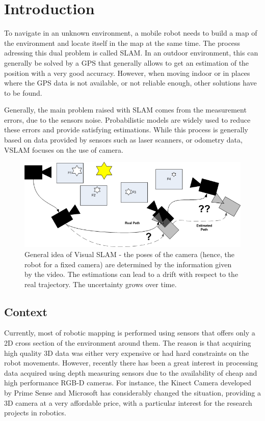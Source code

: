 \chapter{Introduction}

To navigate in an unknown environment, a mobile robot needs to build a map of the environment and locate itself in the map at the same time. The process adressing this dual problem is called \gls{SLAM}. In an outdoor environment, this can generally be solved by a GPS that generally allows to get an estimation of the position with a very good accuracy. However, when moving indoor or in places where the GPS data is not available, or not reliable enough, other solutions have to be found. 

Generally, the main problem raised with \gls{SLAM} comes from the measurement errors, due to the sensors noise. Probabilistic models are widely used to reduce these errors and provide satisfying estimations. While this process is generally based on data provided by sensors such as laser scanners, or odometry data, \gls{VSLAM} focuses on the use of camera. 

\begin{figure}[h!]
\begin{center}
\includegraphics[width=1.0\textwidth]{figures/visual_slam}
\caption{General idea of Visual SLAM - the poses of the camera (hence, the robot for a fixed camera) are determined by the information given by the video. The estimations can lead to a drift with respect to the real trajectory. The uncertainty grows over time.}
\end{center}
\end{figure}

\section{Context}

Currently, most of robotic mapping is performed using sensors that offers only a 2D cross section of the environment around them. The reason is that acquiring high quality 3D data was either very expensive or had hard constraints on the robot movements. However, recently there has been a great interest in processing data acquired using depth measuring sensors due to the availability of cheap and high performance RGB-D cameras. For instance, the Kinect Camera developed by Prime Sense and Microsoft has considerably changed the situation, providing a 3D camera at a very affordable price, with a particular interest for the research projects in robotics.

